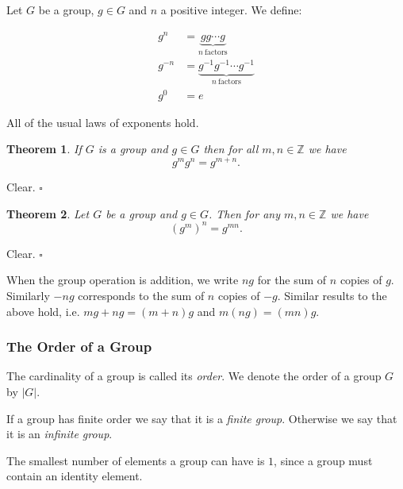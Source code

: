 \documentclass[10pt]{article}
\newtheorem{theorem}{Theorem}[section]
\newenvironment{proof}[1][Proof]{\begin{trivlist}
\item[\hskip \labelsep {\itshape #1}]}{\end{trivlist}}
\newenvironment{definition}[1][Definition]{\begin{trivlist}
\item[\hskip \labelsep {\bfseries #1}]}{\end{trivlist}}
\begin{document}
\begin{definition}
Let $G$ be a group, $g\in G$ and $n$ a positive integer. We define:

\begin{align*}
   g^n &= \underbrace{g g \cdots g}_{n \:\mathrm{factors}}\\
g^{-n} &= \underbrace{g^{-1} g^{-1} \cdots g^{-1}}_{n \:\mathrm{factors}}\\
   g^0 &= e
\end{align*}
\end{definition}

All of the usual laws of exponents hold.

\begin{theorem}
If $G$ is a group and $g \in G$ then for all $m, n \in \mathbb{Z}$ we have
$$g^m g^n = g^{m + n}.$$
\end{theorem}

\begin{proof}
Clear. $\square$
\end{proof}

\begin{theorem}
Let $G$ be a group and $g \in G$. Then for any $m, n \in \mathbb{Z}$ we have
$$(g^{m})^n = g^{mn}.$$
\end{theorem}

\begin{proof}
Clear. $\square$
\end{proof}

When the group operation is addition, we write $ng$ for the sum of $n$ copies of $g$. Similarly $-ng$ corresponds to the sum of $n$ copies of $-g$. Similar results to the above hold, i.e. $mg + ng = (m + n)g$ and $m(ng) = (mn)g$.

\subsubsection{The Order of a Group}

\begin{definition}
The cardinality of a group is called its \emph{order}. We denote the order of a group $G$ by $|G|$.
\end{definition}

\begin{definition}
If a group has finite order we say that it is a \emph{finite group}. Otherwise we say that it is an \emph{infinite group}.
\end{definition}

The smallest number of elements a group can have is $1$, since a group must contain an identity element.
\end{document}
